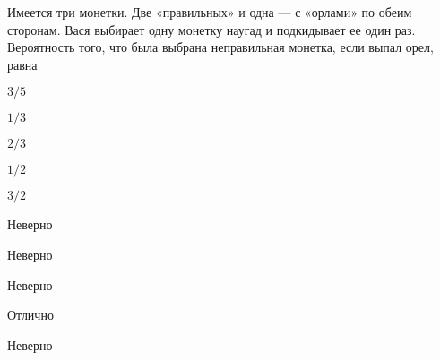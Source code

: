 
\begin{question}
Имеется три монетки. Две «правильных» и одна — с «орлами» по обеим
сторонам. Вася выбирает одну монетку наугад и подкидывает ее один раз.
Вероятность того, что была выбрана неправильная монетка, если выпал
орел, равна
\begin{answerlist}
  \item \(3/5\)
  \item \(1/3\)
  \item \(2/3\)
  \item \(1/2\)
  \item \(3/2\)
\end{answerlist}
\end{question}

\begin{solution}
\begin{answerlist}
  \item Неверно
  \item Неверно
  \item Неверно
  \item Отлично
  \item Неверно
\end{answerlist}
\end{solution}

